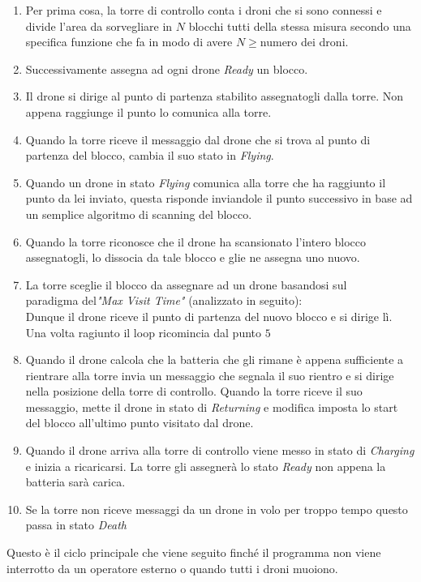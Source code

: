 \documentclass[a4paper, 12pt]{report}
\begin{document}
\begin{enumerate}
    
    \item Per prima cosa, la torre di controllo conta i droni che si sono connessi e divide l'area da sorvegliare in $N$ blocchi tutti della stessa misura secondo una specifica funzione che fa in modo di avere $N \ge $numero dei droni.

    \item Successivamente assegna ad ogni drone \textit{Ready} un blocco.

    \item Il drone si dirige al punto di partenza stabilito assegnatogli dalla torre. Non appena raggiunge il punto lo comunica alla torre.

    \item Quando la torre riceve il messaggio dal drone che si trova al punto di partenza del blocco, cambia il suo stato in \textit{Flying}.

    \item Quando un drone in stato \textit{Flying} comunica alla torre che ha raggiunto il punto da lei inviato, questa risponde inviandole il punto successivo in base ad un semplice algoritmo di scanning del blocco.

    \item Quando la torre riconosce che il drone ha scansionato l'intero blocco assegnatogli, lo dissocia da tale blocco e glie ne assegna uno nuovo.

    \item La torre sceglie il blocco da assegnare ad un drone basandosi sul\\ paradigma del\textit{"Max Visit Time"} (analizzato in seguito):\\
    Dunque il drone riceve il punto di partenza del nuovo blocco e si dirige lì.
    Una volta ragiunto il loop ricomincia dal punto $5$

    \item Quando il drone calcola che la batteria che gli rimane è appena sufficiente a rientrare alla torre invia un messaggio che segnala il suo rientro e si dirige nella posizione della torre di controllo.
    Quando la torre riceve il suo messaggio, mette il drone in stato di \textit{Returning} e modifica imposta lo start del blocco all'ultimo punto visitato dal drone.

    \item Quando il drone arriva alla torre di controllo viene messo in stato di \textit{Charging} e inizia a ricaricarsi.
    La torre gli assegnerà lo stato \textit{Ready} non appena la batteria sarà carica.

    \item Se la torre non riceve messaggi da un drone in volo per troppo tempo questo passa in stato \textit{Death}
\end{enumerate}
Questo è il ciclo principale che viene seguito finché il programma non viene interrotto da un operatore esterno o quando tutti i droni muoiono.
\end{document}
